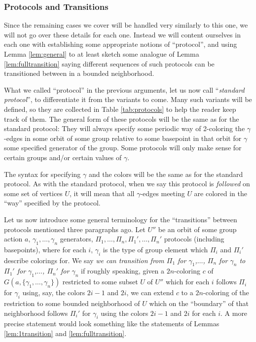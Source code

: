 \documentclass[10pt,a4paper]{article}
\newcommand{\0}{\varnothing}
\begin{document}
\subsubsection{Protocols and Transitions}\label{subsubsec:pro}

Since the remaining cases we cover will be handled very similarly to this one, we will not go over these details for each one. Instead we will content ourselves in each one with establishing some appropriate notions of ``protocol'', and using Lemma \ref{lem:general} to at least sketch some analogue of Lemma \ref{lem:fulltransition} saying different sequences of such protocols can be transitioned between in a bounded neighborhood. 

What we called ``protocol'' in the previous arguments, let us now call ``\textit{standard protocol}'', to differentiate it from the variants to come. Many such variants will be defined, so they are collected in Table \ref{tab:protocols} to help the reader keep track of them. The general form of these protocols will be the same as for the standard protocol: They will always specify some periodic way of 2-coloring the $\gamma$-edges in some orbit of some group relative to some basepoint in that orbit for $\gamma$ some specified generator of the group. Some protocols will only make sense for certain groups and/or certain values of $\gamma$.

The syntax for specifying $\gamma$ and the colors will be the same as for the standard protocol. As with the standard protocol, when we say this protocol is \textit{followed} on some set of vertices $U$, it will mean that all $\gamma$-edges meeting $U$ are colored in the ``way'' specified by the protocol.

Let us now introduce some general terminology for the ``transitions'' between protocols mentioned three paragraphs ago. Let $U''$ be an orbit of some group action $a$, $\gamma_1,\ldots,\gamma_n$ generators, $\Pi_1,\ldots,\Pi_n, \Pi_1',\ldots,\Pi_n'$ protocols (including basepoints), where for each $i$, $\gamma_i$ is the type of group element which $\Pi_i$ and $\Pi_i'$ describe colorings for. We say \textit{we can transition from $\Pi_1$ for $\gamma_1$,$\ldots$, $\Pi_n$ for $\gamma_n$ to $\Pi_1'$ for $\gamma_1$,$\ldots$, $\Pi_n'$ for $\gamma_n$} if roughly speaking, given a $2n$-coloring $c$ of $G(a,\{\gamma_1,\ldots,\gamma_n\})$ restricted to some subset $U$ of $U''$ which for each $i$ follows $\Pi_i$ for $\gamma_i$ using, say, the colors $2i-1$ and $2i$, we can extend $c$ to a $2n$-coloring of the restriction to some bounded neighborhood of $U$ which on the ``boundary'' of that neighborhood follows $\Pi_i'$ for $\gamma_i$ using the colors $2i-1$ and $2i$ for each $i$. A more precise statement would look something like the statements of Lemmas \ref{lem:1transition} and \ref{lem:fulltransition}.
\end{document}
